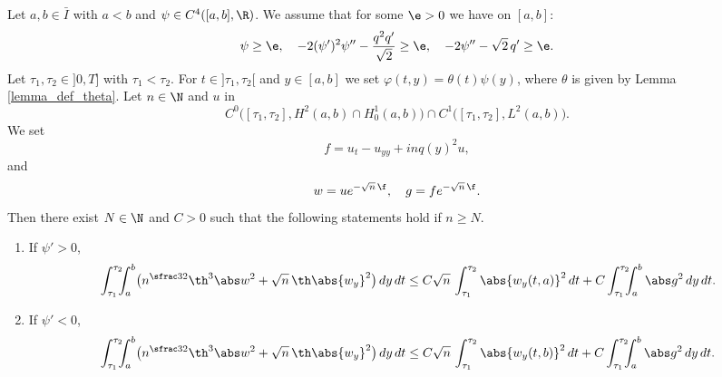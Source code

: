 \begin{proposition} \label{prop-carlemen-theta-psi}
Let $a,b \in \bar I$ with $a < b$ and $\psi \in C^4([a,b],\R)$. We assume that for some $\e > 0$ we have on $[a,b]$:
\[
\psi \geq \e, \quad - 2 (\psi')^2 \psi'' - \frac {q^2 q'}{\sqrt 2} \geq \e , \quad - 2 \psi'' - \sqrt 2\, q' \geq \e.
\]
Let $\tau_1,\tau_2 \in{}]0,T]$ with $\tau_1<\tau_2$. For $t \in{}]\tau_1,\tau_2[$ and $y \in [a,b]$ we set $\varphi(t,y) = \theta(t) \psi(y)$, where $\theta$ is given by Lemma \ref{lemma_def_theta}. Let $n \in \N$ and $u$ in
\begin{equation} \label{eq-C0-C1}
C^0\bigl([\tau_1,\tau_2],H^2(a,b) \cap H_0^1(a,b)\bigr) \cap C^1\bigl([\tau_1,\tau_2],L^2(a,b)\bigr).
\end{equation}
We set
\begin{equation} \label{eq-Kolmogorov-f}
f = u_t - u_{yy} + inq(y)^2 u,
\end{equation}
and
\begin{equation*}
w = u e^{-\sqrt n\,\f}, \quad g = f e^{-\sqrt n\,\f}.
\end{equation*}
Then there exist $N \in \N$ and $C>0$ such that the following statements hold if $n \geq N$.
\begin{enumerate}
\item If $\psi' > 0$,
\[
\int_{\tau_1}^{\tau_2}\hspace*{-2mm} \int_a^b \bigl(n^{\sfrac 32} \th^3 \abs w^2 + \sqrt n\,\th \abs{w_y}^2 \bigr) \, dy \, dt
\leq C \sqrt n\,\int_{\tau_1}^{\tau_2} \abs{w_y(t,a)}^2 \, dt + C \int_{\tau_1}^{\tau_2}\hspace*{-2mm} \int_a^b \abs g^2 \, dy \, dt.
\]
\item If $\psi' < 0$,
\[
\int_{\tau_1}^{\tau_2}\hspace*{-2mm} \int_a^b \bigl(n^{\sfrac 32} \th^3 \abs w^2 + \sqrt n\,\th \abs{w_y}^2 \bigr) \, dy \, dt
\leq C \sqrt n\,\int_{\tau_1}^{\tau_2} \abs{w_y(t,b)}^2 \, dt + C \int_{\tau_1}^{\tau_2}\hspace*{-2mm} \int_a^b \abs g^2 \, dy \, dt.
\]
\end{enumerate}
\end{proposition}

